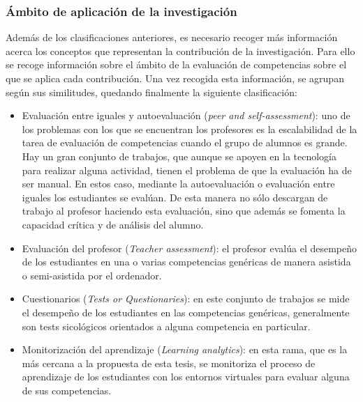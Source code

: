 \subsubsection{Ámbito de aplicación de la investigación}
Además de los clasificaciones anteriores, es necesario recoger más información acerca los conceptos que representan la contribución de la investigación. Para ello se recoge información sobre el ámbito de la evaluación de competencias sobre el que se aplica cada contribución. Una vez recogida esta información, se agrupan según sus similitudes, quedando finalmente la siguiente clasificación:
\begin{itemize}
\item Evaluación entre iguales y autoevaluación (\emph{peer and self-assessment}): uno de los problemas con los que se encuentran los profesores es la escalabilidad de la tarea de evaluación de competencias cuando el grupo de alumnos es grande. Hay un gran conjunto de trabajos, que aunque se apoyen en la tecnología para realizar alguna actividad, tienen el problema de que la evaluación ha de ser manual. En estos caso, mediante la autoevaluación o evaluación entre iguales los estudiantes se evalúan. De esta manera no sólo descargan de trabajo al profesor haciendo esta evaluación, sino que además se fomenta la capacidad crítica y de análisis del alumno.
\item Evaluación del profesor (\emph{Teacher assessment}): el profesor evalúa el desempeño de los estudiantes en una o varias competencias genéricas de manera asistida o semi-asistida por el ordenador.
\item Cuestionarios (\emph{Tests or Questionaries}): en este conjunto de trabajos se mide el desempeño de los estudiantes en las competencias genéricas, generalmente son tests sicológicos orientados a alguna competencia en particular.
\item Monitorización del aprendizaje (\emph{Learning analytics}): en esta rama, que es la más cercana a la propuesta de esta tesis, se monitoriza el proceso de aprendizaje de los estudiantes con los entornos virtuales para evaluar alguna de sus competencias.


\end{itemize}
